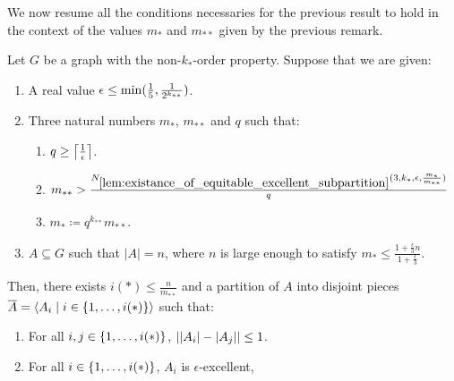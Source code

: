     We now resume all the conditions necessaries for the previous result to hold in the context of the values
    $m_*$ and $m_{**}$ given by the previous remark.

    \begin{lemma}[Corollary 5.15] \label{lem:resume_of_all_conditions_for_excellent_partitions}
        Let $G$ be a graph with the non-$k_{*}$-order property.
        Suppose that we are given:
        \begin{enumerate}
            \item A real value $\epsilon \leq \min ( \frac{1}{5}, \frac{1}{2^{k_{**}}} )$.
            \item Three natural numbers $m_*$, $m_{**}$ and $q$ such that:
                \begin{enumerate}[label=(\alph*), ref=2.\alph*]
                    \item \label{itm:resume_of_all_conditions_for_excellent_partitions.a} $q \geq \left\lceil \frac{1}{\epsilon} \right\rceil$.
                    \item \label{itm:resume_of_all_conditions_for_excellent_partitions.b}
                        $m_{**} > \frac{N_{\ref{lem:existance_of_equitable_excellent_subpartition}}
                            ( 3, k_*, \epsilon, \frac{m_*}{m_{**}} )}{q}$
                    \item \label{itm:resume_of_all_conditions_for_excellent_partitions.c} $m_* \coloneqq q^{k_{**}} m_{**}$.
            \end{enumerate}
            \item \label{itm:resume_of_all_conditions_for_excellent_partitions.3}
                $A \subseteq G$ such that $|A| = n$, where $n$ is large enough to satisfy
                $m_* \leq \frac{1 + \frac{\epsilon}{3}n}{1 + \frac{\epsilon}{3}}$.
        \end{enumerate}
        Then, there exists $i(*) \leq \frac{n}{m_{**}}$ and a partition of $A$ into disjoint pieces
        $\overline{A} = \left< A_i \mid i \in \{ 1, \dots, i(*) \} \right>$ such that:
        \begin{enumerate}[label=(\roman*), ref=\roman*]
            \item \label{itm:resume_of_all_conditions_for_excellent_partitions.i}
                For all $i, j \in \{ 1, \dots, i(*) \}$, $| | A_i |- | A_j | | \leq 1$.
            \item \label{itm:resume_of_all_conditions_for_excellent_partitions.ii}
                For all $i \in \{ 1, \dots, i(*) \}$, $A_i$ is $\epsilon$-excellent,

\end{enumerate}
\end{lemma}
